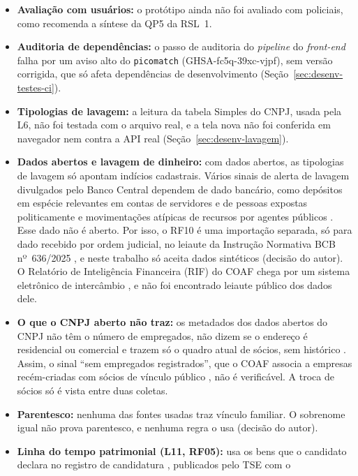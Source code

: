 \begin{itemize}
	\item \textbf{Avaliação com usuários:} o protótipo ainda não foi avaliado
	com policiais, como recomenda a síntese da QP5 da RSL~1.
	\item \textbf{Auditoria de dependências:} o passo de auditoria do
	\textit{pipeline} do \textit{front-end} falha por um aviso alto do
	\texttt{picomatch} (GHSA-fc5q-39xc-vjpf), sem versão corrigida, que só
	afeta dependências de desenvolvimento (Seção~\ref{sec:desenv-testes-ci}).
	\item \textbf{Tipologias de lavagem:} a leitura da tabela Simples do CNPJ,
	usada pela L6, não foi testada com o arquivo real, e a tela nova não foi
	conferida em navegador nem contra a API real
	(Seção~\ref{sec:desenv-lavagem}).
	\item \textbf{Dados abertos e lavagem de dinheiro:} com dados abertos, as
	tipologias de lavagem só apontam indícios cadastrais. Vários sinais de
	alerta de lavagem divulgados pelo Banco Central dependem de dado
	bancário, como depósitos em espécie relevantes em contas de servidores e
	de pessoas expostas politicamente e movimentações atípicas de recursos
	por agentes públicos \cite[art. 1º, I, n, e VII, a]{bcb2020cc4001}. Esse
	dado não é aberto. Por isso, o RF10 é uma importação separada, só para
	dado recebido por ordem judicial, no leiaute da Instrução Normativa BCB
	nº~636/2025 \cite{bcb2025in636}, e neste trabalho só aceita dados
	sintéticos (decisão do autor). O Relatório de Inteligência Financeira
	(RIF) do COAF chega por um sistema eletrônico de intercâmbio
	\cite[art. 1º]{coaf2026portaria60}, e não foi encontrado leiaute público
	dos dados dele.
	\item \textbf{O que o CNPJ aberto não traz:} os metadados dos dados
	abertos do CNPJ não têm o número de empregados, não dizem se o endereço é
	residencial ou comercial e trazem só o quadro atual de sócios, sem
	histórico \cite{rfbcnpjmetadados}. Assim, o sinal ``sem empregados
	registrados'', que o COAF associa a empresas recém-criadas com sócios de
	vínculo público \cite[tipologia 2.7]{coaf2021casos}, não é verificável.
	A troca de sócios só é vista entre duas coletas.
	\item \textbf{Parentesco:} nenhuma das fontes usadas traz vínculo
	familiar. O sobrenome igual não prova parentesco, e nenhuma regra o usa
	(decisão do autor).
	\item \textbf{Linha do tempo patrimonial (L11, RF05):} usa os bens que o
	candidato declara no registro de candidatura
	\cite[art. 11, § 1º, IV]{brasil1997lei9504}, publicados pelo TSE com o

\end{itemize}
